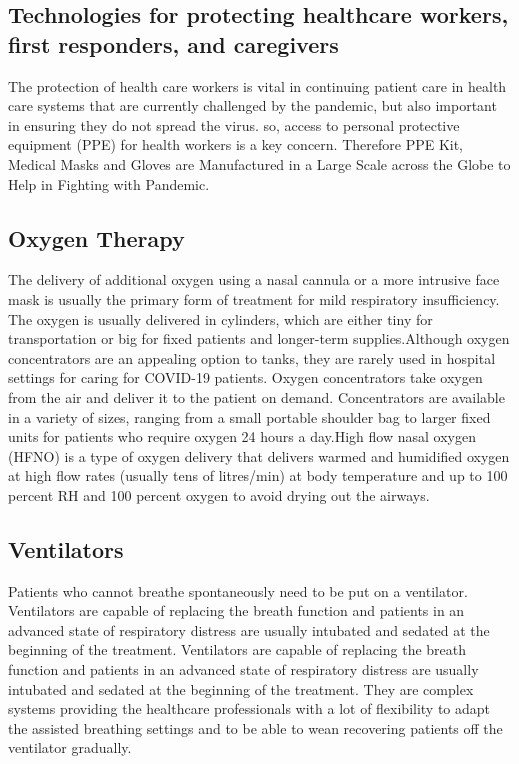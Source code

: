 \documentclass[12pt]{article}
\begin{document}
\subsection{Technologies for protecting healthcare workers, first responders, and caregivers}
 The protection of health care workers is vital in continuing patient care in health care systems that are currently challenged by the pandemic, but also important in ensuring they do not spread the virus. so, access to personal protective equipment (PPE) for health workers is a key concern. Therefore PPE Kit, Medical Masks and Gloves are Manufactured in a Large Scale across the Globe to Help in Fighting with Pandemic.

\subsection{Oxygen Therapy}
The delivery of additional oxygen using a nasal cannula or a more intrusive face mask is usually the primary form of treatment for mild respiratory insufficiency. The oxygen is usually delivered in cylinders, which are either tiny for transportation or big for fixed patients and longer-term supplies.Although oxygen concentrators are an appealing option to tanks, they are rarely used in hospital settings for caring for COVID-19 patients. Oxygen concentrators take oxygen from the air and deliver it to the patient on demand. Concentrators are available in a variety of sizes, ranging from a small portable shoulder bag to larger fixed units for patients who require oxygen 24 hours a day.High flow nasal oxygen (HFNO) is a type of oxygen delivery that delivers warmed and humidified oxygen at high flow rates (usually tens of litres/min) at body temperature and up to 100 percent RH and 100 percent oxygen to avoid drying out the airways.
\subsection{Ventilators}
Patients who cannot breathe spontaneously need to be put on a ventilator. Ventilators are capable of replacing the breath function and patients in an advanced state of respiratory distress are usually intubated and sedated at the beginning of the treatment.\newline
Ventilators are capable of replacing the breath function and patients in an advanced state of respiratory distress are usually intubated and sedated at the beginning of the treatment. They are complex systems providing the healthcare professionals with a lot of flexibility to adapt the assisted breathing settings and to be able to wean recovering patients off the ventilator gradually.
\end{document}
